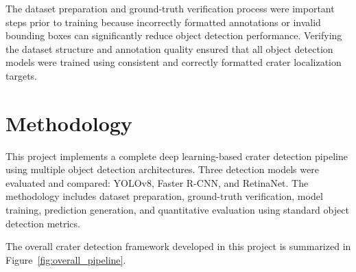 \documentclass[conference]{IEEEtran}
\begin{document}
	The dataset preparation and ground-truth verification process were important steps prior to training because incorrectly formatted annotations or invalid bounding boxes can significantly reduce object detection performance. Verifying the dataset structure and annotation quality ensured that all object detection models were trained using consistent and correctly formatted crater localization targets.
	
	\section{Methodology}
	
	This project implements a complete deep learning-based crater detection pipeline using multiple object detection architectures. Three detection models were evaluated and compared: YOLOv8, Faster R-CNN, and RetinaNet. The methodology includes dataset preparation, ground-truth verification, model training, prediction generation, and quantitative evaluation using standard object detection metrics.
	
	The overall crater detection framework developed in this project is summarized in Figure~\ref{fig:overall_pipeline}.
	
\end{document}

